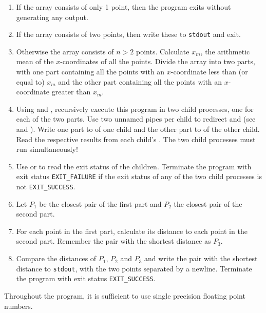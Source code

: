 \begin{enumerate}
\item If the array consists of only 1 point, then the program exits without generating any output.

\item If the array consists of two points, then write these to \texttt{stdout} and exit.

\item Otherwise the array consists of $n>2$ points.
Calculate $x_m$, the arithmetic mean of the $x$-coordinates of all the points.
Divide the array into two parts,
with one part containing all the points
with an $x$-coordinate less than (or equal to) $x_m$
and the other part containing all the points
with an $x$-coordinate greater than $x_m$.

\item Using  and ,
recursively execute this program in two child processes,
one for each of the two parts.
Use two unnamed pipes per child
to redirect  and 
(see  and ).
Write one part to  of one child
and the other part to  of the other child.
Read the respective results from each child's .
The two child processes must run simultaneously!

\item Use  or 
to read the exit status of the children.
Terminate the program with exit status \verb|EXIT_FAILURE|
if the exit status of any of the two child processes is not \verb|EXIT_SUCCESS|.

\item Let $P_1$ be the closest pair of the first part and $P_2$ the closest pair of the second part.

\item For each point in the first part,
calculate its distance to each point in the second part.
Remember the pair with the shortest distance as $P_3$.

\item Compare the distances of $P_1$, $P_2$ and $P_3$
and write the pair with the shortest distance to \texttt{stdout},
with the two points separated by a newline.
Terminate the program with exit status \verb|EXIT_SUCCESS|.
\end{enumerate}

Throughout the program,
it is sufficient to use single precision floating point numbers.

